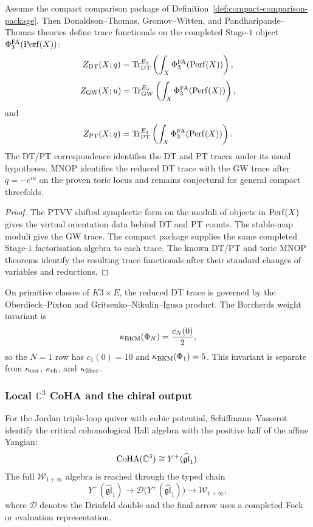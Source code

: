 \begin{proposition}
\label{prop:dt-gw-pt-traces}
Assume the compact comparison package of
Definition~\ref{def:compact-comparison-package}. Then Donaldson--Thomas,
Gromov--Witten, and Pandharipande--Thomas theories define trace
functionals on the completed Stage-$1$ object
$\Phi^{\mathrm{FA}}_3(\mathrm{Perf}(X))$:
\[
  Z_{\mathrm{DT}}(X;q)=
  \operatorname{Tr}_{\mathrm{DT}}^{E_3}
  \left(\int_X \Phi^{\mathrm{FA}}_3(\mathrm{Perf}(X))\right),
\]
\[
  Z_{\mathrm{GW}}(X;u)=
  \operatorname{Tr}_{\mathrm{GW}}^{E_3}
  \left(\int_X \Phi^{\mathrm{FA}}_3(\mathrm{Perf}(X))\right),
\]
and
\[
  Z_{\mathrm{PT}}(X;q)=
  \operatorname{Tr}_{\mathrm{PT}}^{E_3}
  \left(\int_X \Phi^{\mathrm{FA}}_3(\mathrm{Perf}(X))\right).
\]
The DT/PT correspondence identifies the DT and PT traces under its
usual hypotheses. MNOP identifies the reduced DT trace with the GW
trace after $q=-e^{iu}$ on the proven toric locus and remains
conjectural for general compact threefolds.
\end{proposition}

\begin{proof}
The PTVV shifted symplectic form on the moduli of objects in
$\mathrm{Perf}(X)$ gives the virtual orientation data behind DT and PT counts.
The stable-map moduli give the GW trace. The compact package supplies
the same completed Stage-$1$ factorisation algebra to each trace. The
known DT/PT and toric MNOP theorems identify the resulting trace
functionals after their standard changes of variables and reductions.
\end{proof}

\begin{remark}
\label{rmk:k3xe-trace-weight}
On primitive classes of $K3\times E$, the reduced DT trace is governed
by the Oberdieck--Pixton and Gritsenko--Nikulin--Igusa product. The
Borcherds weight invariant is
\[
  \kappa_{\mathrm{BKM}}(\Phi_N)=\frac{c_N(0)}2,
\]
so the $N=1$ row has $c_1(0)=10$ and
$\kappa_{\mathrm{BKM}}(\Phi_1)=5$. This invariant is separate from
$\kappa_{\mathrm{cat}}$, $\kappa_{\mathrm{ch}}$, and $\kappa_{\mathrm{fiber}}$.
\end{remark}

\subsubsection{Local \texorpdfstring{$\mathbb C^3$}{C3} CoHA and the chiral output}
\label{wn:subsubsec:c3-coha-output}

\begin{proposition}
\label{prop:c3-coha-positive-half}
For the Jordan triple-loop quiver with cubic potential,
Schiffmann--Vasserot identify the critical cohomological Hall algebra
with the positive half of the affine Yangian:
\[
  \mathrm{CoHA}(\mathbb C^3)\cong Y^+(\widehat{\mathfrak{gl}}_1).
\]
The full $\mathcal W_{1+\infty}$ algebra is reached through the typed
chain
\[
  Y^+(\widehat{\mathfrak{gl}}_1)
  \longrightarrow
  \mathcal D\bigl(Y^+(\widehat{\mathfrak{gl}}_1)\bigr)
  \longrightarrow
  \mathcal W_{1+\infty},
\]
where $\mathcal D$ denotes the Drinfeld double and the final arrow
uses a completed Fock or evaluation representation.
\end{proposition}

